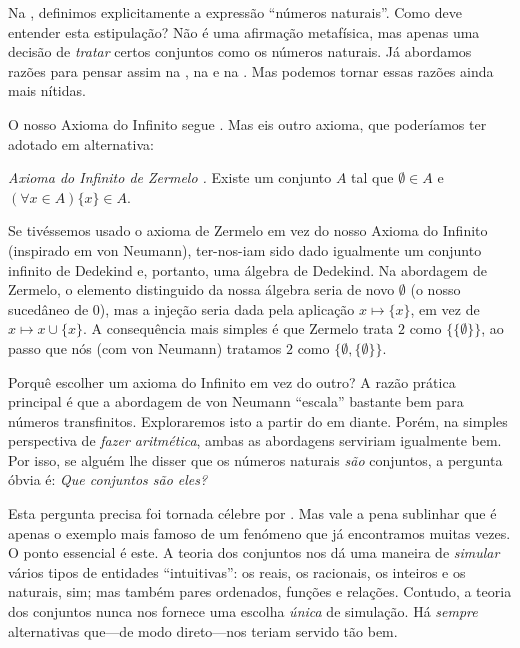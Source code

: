 \documentclass[../../../include/open-logic-section]{subfiles}
\begin{document}
	


Na , definimos explicitamente
a expressão ``números naturais''. Como deve entender esta
estipulação? Não é uma afirmação metafísica, mas apenas uma decisão de
\emph{tratar} certos conjuntos como os números naturais. Já abordamos razões para pensar assim na
, na  e na
. Mas podemos tornar essas
razões ainda mais nítidas.

O nosso Axioma do Infinito segue \citet{VonNeumann1925}. Mas eis outro axioma, que poderíamos ter adotado em alternativa:

\begin{defish}
\emph{Axioma do Infinito de Zermelo \citeyear{Zermelo1908Untersuchungen}.} Existe um conjunto $A$ tal que $\emptyset \in A$ e
$(\forall x \in A)\{x\} \in A$. 
\end{defish}

Se tivéssemos usado o axioma de Zermelo em vez do nosso Axioma do Infinito (inspirado em von Neumann), ter-nos-iam sido dado igualmente um conjunto infinito de Dedekind e, portanto, uma álgebra de Dedekind. Na abordagem de Zermelo, o
elemento distinguido da nossa álgebra seria de novo $\emptyset$
(o nosso sucedâneo de $0$), mas a injeção seria dada pela
aplicação $x \mapsto \{x\}$, em vez de $x \mapsto x \cup \{x\}$. A
consequência mais simples é que Zermelo trata $2$ como
$\{\{\emptyset\}\}$, ao passo que nós (com von Neumann) tratamos $2$ como
$\{\emptyset, \{\emptyset\}\}$. 

Porquê escolher um axioma do Infinito em vez do outro? A razão
prática principal é que a abordagem de von Neumann ``escala'' bastante
bem para números transfinitos. Exploraremos isto a partir do
 em diante. Porém, na simples perspectiva de
\emph{fazer aritmética}, ambas as abordagens serviriam
igualmente bem. Por isso, se alguém lhe disser que os números naturais
\emph{são} conjuntos, a pergunta óbvia é: \emph{Que conjuntos são eles?} 

Esta pergunta precisa foi tornada célebre por \citet{Benacerraf1965}. Mas
vale a pena sublinhar que é apenas o exemplo mais famoso de um
fenómeno que já encontramos muitas vezes. O ponto essencial é este. A teoria dos conjuntos nos dá uma maneira de \emph{simular} vários
tipos de entidades ``intuitivas'': os reais, os racionais, os inteiros e os
naturais, sim; mas também pares ordenados, funções e relações.
Contudo, a teoria dos conjuntos nunca nos fornece uma escolha
\emph{única} de simulação. Há \emph{sempre} alternativas
que---de modo direto---nos teriam servido tão bem. 
\end{document}
